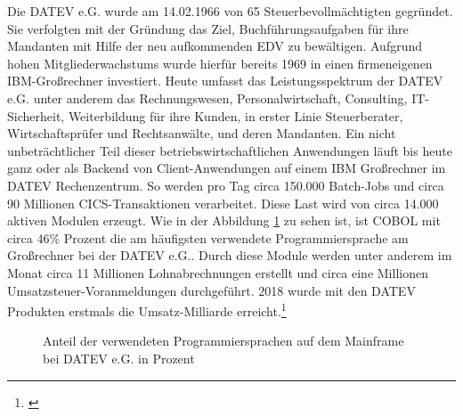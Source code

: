 Die DATEV e.G. wurde am 14.02.1966 von 65 Steuerbevollmächtigten gegründet.
Sie verfolgten mit der Gründung das Ziel, Buchführungsaufgaben für ihre Mandanten mit Hilfe der neu aufkommenden EDV zu bewältigen.
Aufgrund hohen Mitgliederwachstums wurde hierfür bereits 1969 in einen firmeneigenen IBM-Großrechner investiert.\cite{.25.11.2019c}
Heute umfasst das Leistungsspektrum der DATEV e.G. unter anderem das Rechnungswesen, Personalwirtschaft, Consulting, IT-Sicherheit, Weiterbildung für ihre Kunden, in erster Linie Steuerberater, Wirtschaftsprüfer und Rechtsanwälte, und deren Mandanten.
Ein nicht unbeträchtlicher Teil dieser betriebswirtschaftlichen Anwendungen läuft bis heute ganz oder als Backend von Client-Anwendungen auf einem IBM Großrechner im DATEV Rechenzentrum.
So werden pro Tag circa 150.000 \Glspl{Batch-Job} und circa 90 Millionen CICS-Transaktionen verarbeitet.
Diese Last wird von circa 14.000 aktiven Modulen erzeugt.
Wie in der Abbildung \ref{fig:Programmiersprachen} zu sehen ist, ist COBOL mit circa 46\% Prozent die am häufigsten verwendete Programmiersprache am Großrechner bei der DATEV e.G..
Durch diese Module werden unter anderem im Monat circa 11 Millionen Lohnabrechnungen erstellt und circa eine Millionen Umsatzsteuer-Voranmeldungen durchgeführt. 
2018 wurde mit den DATEV Produkten erstmals die Umsatz-Milliarde erreicht.\footnote{\cite{.27.2.2020b}}

\begin{figure}
\centering
\caption{Anteil der verwendeten Programmiersprachen auf dem Mainframe bei DATEV e.G. in Prozent}
\label{fig:Programmiersprachen}
\end{figure}

